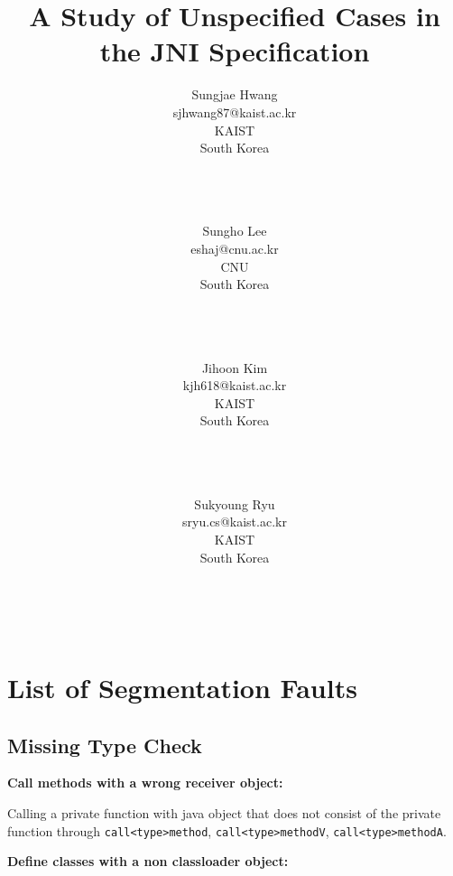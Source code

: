 \documentclass[10pt]{article}
\begin{document}
\title{A Study of Unspecified Cases in the JNI Specification}

\author{Sungjae Hwang \\ sjhwang87@kaist.ac.kr \\ KAIST \\ South Korea \\ \\ \\ \\ 
   \and Sungho Lee \\  eshaj@cnu.ac.kr \\ CNU \\ South Korea \\ \\ \\ \\ 
   \and Jihoon Kim \\  kjh618@kaist.ac.kr \\ KAIST \\ South Korea \\ \\ \\ \\ 
   \and Sukyoung Ryu \\  sryu.cs@kaist.ac.kr \\ KAIST \\ South Korea \\ \\ \\ \\ }

\maketitle

\section{List of Segmentation Faults} 

\subsection{Missing Type Check}
\noindent \textbf{Call methods with a wrong receiver object:} 

Calling a private function with java object that does not consist of the private function through {\tt call<type>method}, {\tt call<type>methodV}, {\tt call<type>methodA}.

\vspace{3mm}
\noindent \textbf{Define classes with a non classloader object:}
\end{document}
